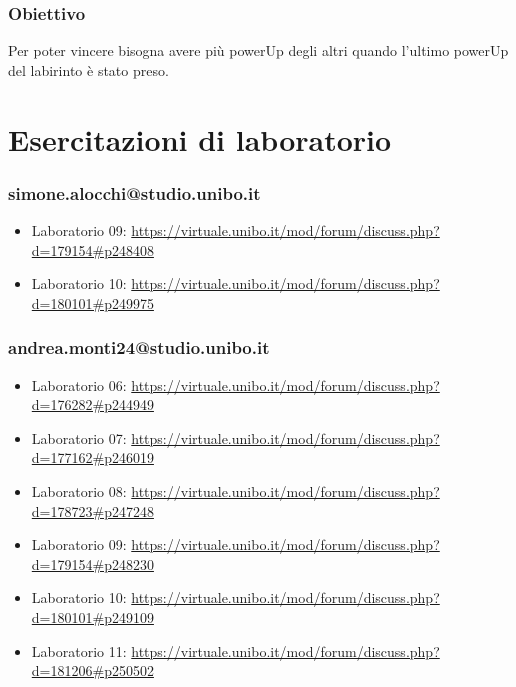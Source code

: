 \documentclass[a4paper,12pt]{report}
\begin{document}
\subsection*{Obiettivo}

Per poter vincere bisogna avere più powerUp degli altri quando l'ultimo powerUp del labirinto è stato preso.

\chapter{Esercitazioni di laboratorio}

\subsection{simone.alocchi@studio.unibo.it}

\begin{itemize}
 \item Laboratorio 09: \url{https://virtuale.unibo.it/mod/forum/discuss.php?d=179154#p248408}
 \item Laboratorio 10: \url{https://virtuale.unibo.it/mod/forum/discuss.php?d=180101#p249975}
\end{itemize}

\subsection{andrea.monti24@studio.unibo.it}

\begin{itemize}
 \item Laboratorio 06: \url{https://virtuale.unibo.it/mod/forum/discuss.php?d=176282#p244949}
 \item Laboratorio 07: \url{https://virtuale.unibo.it/mod/forum/discuss.php?d=177162#p246019}
 \item Laboratorio 08: \url{https://virtuale.unibo.it/mod/forum/discuss.php?d=178723#p247248}
 \item Laboratorio 09: \url{https://virtuale.unibo.it/mod/forum/discuss.php?d=179154#p248230}
 \item Laboratorio 10: \url{https://virtuale.unibo.it/mod/forum/discuss.php?d=180101#p249109}
 \item Laboratorio 11: \url{https://virtuale.unibo.it/mod/forum/discuss.php?d=181206#p250502}
\end{itemize}
\end{document}
